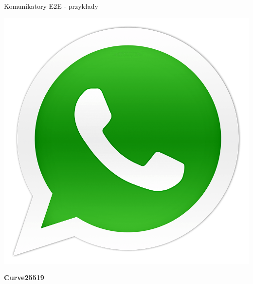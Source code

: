 \begin{frame}{Komunikatory E2E - przykłady}
\begin{center}
        \begin{minipage}{0.1\textwidth}
            \includegraphics[width=\textwidth]{applications/graphics/WhatsApp.png}
        \end{minipage}
        \begin{minipage}{0.6\textwidth}
            \textbf{Curve25519}
        \end{minipage}

        \vspace{0.3cm}


\end{center}
\end{frame}
